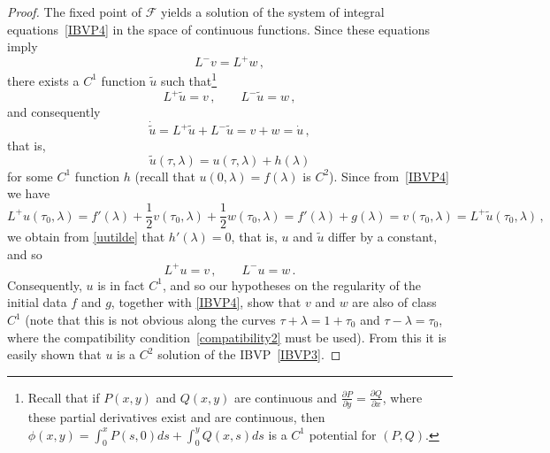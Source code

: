 \documentclass[10pt]{amsart}
\newcommand{\cF}{\mathcal{F}}
\begin{document}
\begin{proof}
The fixed point of $\cF$ yields a solution of the system of integral equations~\eqref{IBVP4} in the space of continuous functions. Since these equations imply
\begin{equation}
L^- v = L^+w  \, ,
\end{equation}
there exists a $C^1$ function $\tilde{u}$ such that\footnote{Recall that if $P(x,y)$ and $Q(x,y)$ are continuous and $\frac{\partial P}{\partial y} = \frac{\partial Q}{\partial x}$, where these partial derivatives exist and are continuous, then $\phi(x,y) = \int_0^x P(s,0) ds + \int_0^y Q(x,s) ds$ is a $C^1$ potential for $(P,Q)$.}
\begin{equation}
L^+\tilde{u} = v \, , \qquad L^-\tilde{u} = w \, ,
\end{equation}
and consequently
\begin{equation}
\dot{\tilde{u}} = L^+\tilde{u} + L^-\tilde{u} = v + w = \dot{u} \, ,
\end{equation}
that is,
\begin{equation} \label{uutilde}
\tilde{u}(\tau,\lambda) = u(\tau,\lambda) + h(\lambda)
\end{equation}
for some $C^1$ function $h$ (recall that $u(0,\lambda)=f(\lambda)$ is $C^2$). Since from~\eqref{IBVP4} we have
\begin{equation}
L^+u(\tau_0,\lambda) = f'(\lambda) + \frac12 v(\tau_0,\lambda) + \frac12 w(\tau_0,\lambda) = f'(\lambda) + g(\lambda) = v(\tau_0,\lambda) = L^+ \tilde{u}(\tau_0,\lambda) \, ,
\end{equation}
we obtain from \eqref{uutilde} that $h'(\lambda)=0$, that is, $u$ and $\tilde{u}$ differ by a constant, and so
\begin{equation}
L^+u = v \, , \qquad L^-u = w \, .
\end{equation}
Consequently, $u$ is in fact $C^1$, and so our hypotheses on the regularity of the initial data $f$ and $g$, together with \eqref{IBVP4}, show that $v$ and $w$ are also of class $C^1$ (note that this is not obvious along the curves $\tau + \lambda = 1 + \tau_0$ and $\tau - \lambda = \tau_0$, where the compatibility condition~\eqref{compatibility2} must be used). From this it is easily shown that $u$ is a $C^2$ solution of the IBVP~\eqref{IBVP3}.


\end{proof}
\end{document}
